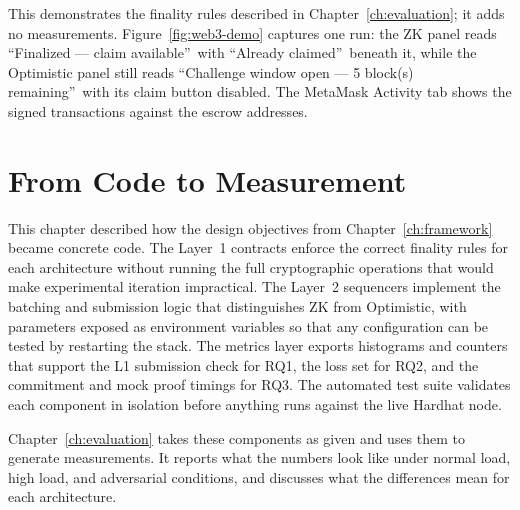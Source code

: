 This demonstrates the finality rules described in Chapter~\ref{ch:evaluation}; it adds no measurements. Figure~\ref{fig:web3-demo} captures one run: the ZK panel reads \textquotedblleft Finalized --- claim available\textquotedblright\ with \textquotedblleft Already claimed\textquotedblright\ beneath it, while the Optimistic panel still reads \textquotedblleft Challenge window open --- 5 block(s) remaining\textquotedblright\ with its claim button disabled. The MetaMask Activity tab shows the signed transactions against the escrow addresses.

\section{From Code to Measurement}

This chapter described how the design objectives from Chapter~\ref{ch:framework} became concrete code. The Layer~1 contracts enforce the correct finality rules for each architecture without running the full cryptographic operations that would make experimental iteration impractical. The Layer~2 sequencers implement the batching and submission logic that distinguishes ZK from Optimistic, with parameters exposed as environment variables so that any configuration can be tested by restarting the stack. The metrics layer exports histograms and counters that support the L1 submission check for RQ1, the loss set for RQ2, and the commitment and mock proof timings for RQ3. The automated test suite validates each component in isolation before anything runs against the live Hardhat node.

Chapter~\ref{ch:evaluation} takes these components as given and uses them to generate measurements. It reports what the numbers look like under normal load, high load, and adversarial conditions, and discusses what the differences mean for each architecture.
